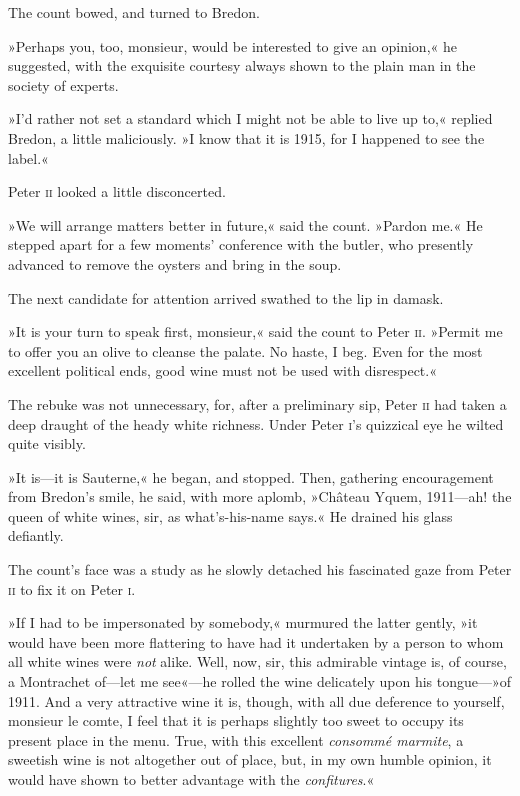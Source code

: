 The count bowed, and turned to Bredon.

»Perhaps you, too, monsieur, would be interested to give an opinion,« he suggested, with the exquisite courtesy always shown to the plain man in the society of experts.

»I'd rather not set a standard which I might not be able to live up to,« replied Bredon, a little maliciously. »I know that it is 1915, for I happened to see the label.«

Peter \textsc{ii} looked a little disconcerted.

»We will arrange matters better in future,« said the count. »Pardon me.« He stepped apart for a few moments' conference with the butler, who presently advanced to remove the oysters and bring in the soup.

The next candidate for attention arrived swathed to the lip in damask.

»It is your turn to speak first, monsieur,« said the count to Peter \textsc{ii}. »Permit me to offer you an olive to cleanse the palate. No haste, I beg. Even for the most excellent political ends, good wine must not be used with disrespect.«

The rebuke was not unnecessary, for, after a preliminary sip, Peter \textsc{ii} had taken a deep draught of the heady white richness. Under Peter \textsc{i}'s quizzical eye he wilted quite visibly.

»It is—it is Sauterne,« he began, and stopped. Then, gathering encouragement from Bredon's smile, he said, with more aplomb, »Château Yquem, 1911—ah! the queen of white wines, sir, as what's-his-name says.« He drained his glass defiantly.

The count's face was a study as he slowly detached his fascinated gaze from Peter \textsc{ii} to fix it on Peter \textsc{i}.

»If I had to be impersonated by somebody,« murmured the latter gently, »it would have been more flattering to have had it undertaken by a person to whom all white wines were \textit{not} alike. Well, now, sir, this admirable vintage is, of course, a Montrachet of—let me see«—he rolled the wine delicately upon his tongue—»of 1911. And a very attractive wine it is, though, with all due deference to yourself, monsieur le comte, I feel that it is perhaps slightly too sweet to occupy its present place in the menu. True, with this excellent \textit{consommé marmite}, a sweetish wine is not altogether out of place, but, in my own humble opinion, it would have shown to better advantage with the \textit{confitures}.«

